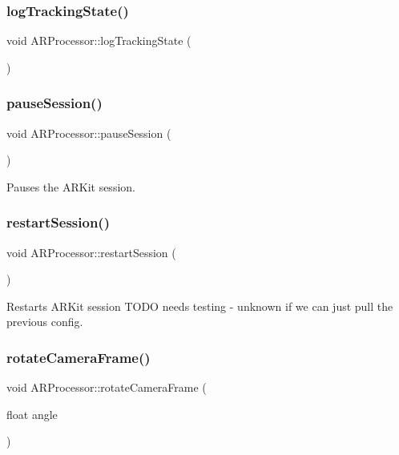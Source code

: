 \subsubsection{\texorpdfstring{log\+Tracking\+State()}{logTrackingState()}}
{\footnotesize\ttfamily void A\+R\+Processor\+::log\+Tracking\+State (\begin{DoxyParamCaption}{ }\end{DoxyParamCaption})}

\mbox{\label{class_a_r_processor_a035d352220785ee03e1bb15ba6bf688d}} 
\subsubsection{\texorpdfstring{pause\+Session()}{pauseSession()}}
{\footnotesize\ttfamily void A\+R\+Processor\+::pause\+Session (\begin{DoxyParamCaption}{ }\end{DoxyParamCaption})}



Pauses the A\+R\+Kit session. 

\mbox{\label{class_a_r_processor_a121cd3925743680196771ce07058d52e}} 
\subsubsection{\texorpdfstring{restart\+Session()}{restartSession()}}
{\footnotesize\ttfamily void A\+R\+Processor\+::restart\+Session (\begin{DoxyParamCaption}{ }\end{DoxyParamCaption})}

Restarts A\+R\+Kit session T\+O\+DO needs testing -\/ unknown if we can just pull the previous config. \mbox{\label{class_a_r_processor_a2514281144c680e13c02562c74746ceb}} 
\subsubsection{\texorpdfstring{rotate\+Camera\+Frame()}{rotateCameraFrame()}}
{\footnotesize\ttfamily void A\+R\+Processor\+::rotate\+Camera\+Frame (\begin{DoxyParamCaption}\item[{float}]{angle }\end{DoxyParamCaption})}

